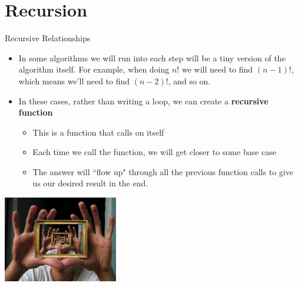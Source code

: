 {}\documentclass[letterpaper,
compress,
xcolor=x11names,
]{beamer}
\begin{document}
\section{Recursion}

\begin{frame}{Recursive Relationships}
	\footnotesize
	\begin{itemize}
		\item In some algorithms we will run into each step will be a tiny version of the algorithm itself. For example, when doing $n!$ we will need to find $(n-1)!$, which means we'll need to find $(n-2)!$, and so on. 
		\item<2-> In these cases, rather than writing a loop, we can create a \textbf{recursive function}
		\begin{itemize}
			\item This is a function that calls on itself
			\item<3-> Each time we call the function, we will get closer to some base case
			\item<3-> The answer will ``flow up" through all the previous function calls to give us our desired result in the end.
		\end{itemize} 
	\end{itemize}
	\begin{center}
		\includegraphics[width = 5cm]{recursion_mirror.jpg}
	\end{center}
\end{frame}

\end{document}
